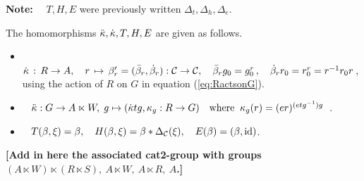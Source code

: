 \noindent
{\bf Note:}~~ $T,H,E$ were previously written $\Delta_t,\Delta_h,\Delta_e$. 

\bigskip\noindent
The homomorphisms 
$\ddot{\kappa}, \dot{\kappa}, T, H, E$ are given as follows.
\begin{itemize}
\item~
$\dot{\kappa} \,:\, R \to A, \quad
r \,\mapsto\, \beta'_r = (\bar{\beta}_r,\dot{\beta}_r) : \mathcal{C} \to \mathcal{C},
\quad  \bar{\beta}_r g_0 = g_0^r\,,
\quad  \dot{\beta}_r r_0 = r_0^r = r^{-1}r_0r$\,,\\
using the action of $R$ on $G$ in equation (\ref{eq:RactsonG}).
\item~
$\ddot{\kappa} : G \to A \ltimes W,\;
g \mapsto (\dot{\kappa} tg, \kappa_g : R \to G)
\quad\mbox{where}\;\;  \kappa_g(r) = (er)^{(etg^{-1})g}$~.
\item~
$T(\beta,\xi) = \beta, \quad
H(\beta,\xi) = \beta \ast \Delta_{\mathcal{C}}(\xi), \quad
E(\beta) = (\beta,\mathrm{id})$.
\end{itemize}

\bigskip\noindent
{\bf [Add in here the associated cat2-group with groups 
$(A \ltimes W) \ltimes (R \ltimes S),~
A \ltimes W,~ A \ltimes R,~ A$.]}
